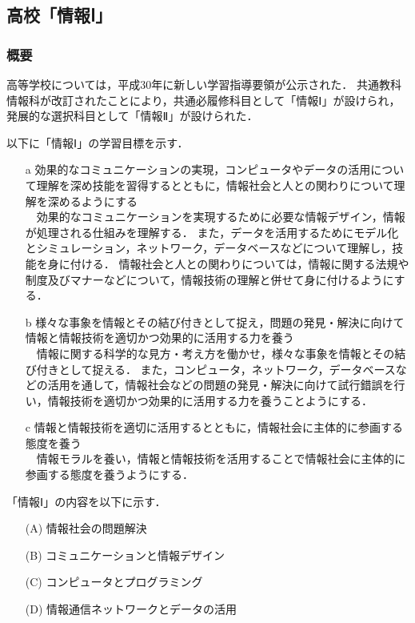 \documentclass[12pt,a4j,titlepage]{ltjsarticle}
\begin{document}
\clearpage

\subsection{高校「情報Ⅰ」}
\subsubsection{概要}
高等学校については，平成30年に新しい学習指導要領が公示された．
共通教科情報科が改訂されたことにより\cite{koukou_sidou}，共通必履修科目として「情報Ⅰ」が設けられ，発展的な選択科目として「情報Ⅱ」が設けられた．

以下に「情報Ⅰ」の学習目標を示す．
\begin{enumerate}

\item[a] 効果的なコミュニケーションの実現，コンピュータやデータの活用について理解を深め技能を習得するとともに，情報社会と人との関わりについて理解を深めるようにする\mbox{}\\
　効果的なコミュニケーションを実現するために必要な情報デザイン，情報が処理される仕組みを理解する．
また，データを活用するためにモデル化とシミュレーション，ネットワーク，データベースなどについて理解し，技能を身に付ける．
情報社会と人との関わりについては，情報に関する法規や制度及びマナーなどについて，情報技術の理解と併せて身に付けるようにする．
\\
\item[b] 様々な事象を情報とその結び付きとして捉え，問題の発見・解決に向けて情報と情報技術を適切かつ効果的に活用する力を養う\mbox{}\\
　情報に関する科学的な見方・考え方を働かせ，様々な事象を情報とその結び付きとして捉える．
また，コンピュータ，ネットワーク，データベースなどの活用を通して，情報社会などの問題の発見・解決に向けて試行錯誤を行い，情報技術を適切かつ効果的に活用する力を養うことようにする．
\\
\item[c] 情報と情報技術を適切に活用するとともに，情報社会に主体的に参画する態度を養う\mbox{}\\
　情報モラルを養い，情報と情報技術を活用することで情報社会に主体的に参画する態度を養うようにする．
 
\end{enumerate}

「情報Ⅰ」の内容を以下に示す．
\begin{enumerate}

\item[(A)] 情報社会の問題解決\mbox{}

\item[(B)] コミュニケーションと情報デザイン\mbox{}

\item[(C)] コンピュータとプログラミング\mbox{}

\item[(D)] 情報通信ネットワークとデータの活用\mbox{}
\end{enumerate}
\end{document}

